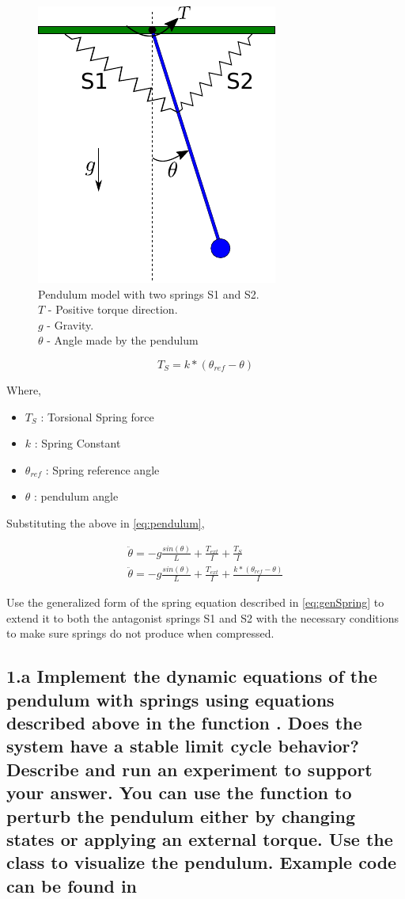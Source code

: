 \documentclass{cmc}
\begin{document}
\begin{figure}[H]
  \centering
  \includegraphics[width=.3\textwidth]{figures/pendulum_spring}
  \caption[pendulum with spring]{Pendulum model with two springs S1
    and S2.\\
    $T$ - Positive torque direction.\\
    $g$ - Gravity.\\
    $\theta$ - Angle made by the pendulum}
  \label{fig:pendulum_spring}
\end{figure}


\begin{equation}
  \label{eqn:spring}
  T_{S} = k*(\theta_{ref} - \theta)
\end{equation}

Where,
\begin{itemize}
\item $T_{S}$ : Torsional Spring force
\item $k$ : Spring Constant
\item $\theta_{ref}$ : Spring reference angle
\item $\theta$ : pendulum angle
\end{itemize}

Substituting the above in \ref{eq:pendulum},

\begin{eqnarray}
  \label{eq:spring}
  \ddot{\theta} = -g\frac{sin(\theta)}{L} + \frac{T_{ext}}{I} + \frac{T_{S}}{I} \\
  \ddot{\theta} = -g\frac{sin(\theta)}{L} + \frac{T_{ext}}{I} + \frac{k*(\theta_{ref} - \theta)}{I} \label{eq:genSpring}
\end{eqnarray}

Use the generalized form of the spring equation described in
\ref{eq:genSpring} to extend it to both the antagonist springs S1 and
S2 with the necessary conditions to make sure springs do not produce
when compressed.



\subsection*{1.a Implement the dynamic equations of the pendulum with
  springs using equations described above in the function
  .  Does the system
  have a stable limit cycle behavior?  Describe and run an experiment
  to support your answer. You can use the function
   to perturb the
  pendulum either by changing states or applying an external torque.
  Use the class  to
  visualize the pendulum. Example code can be found in
  }
\label{subsec:1.a}
\end{document}
